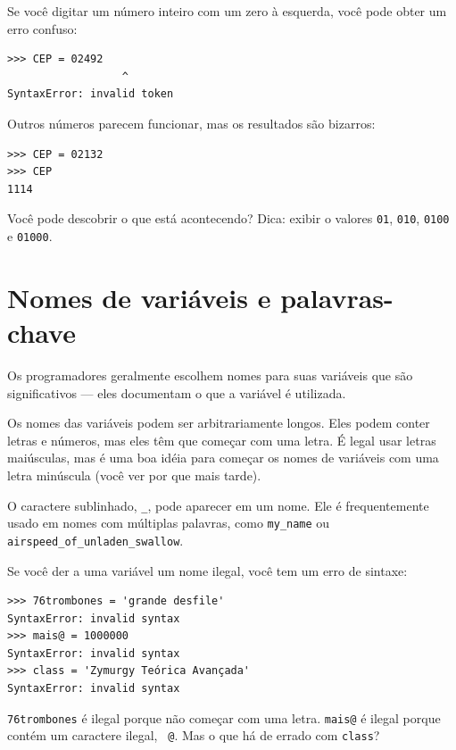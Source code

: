 \documentclass[10pt]{book}
\begin{document}
\begin{exercise}

Se você digitar um número inteiro com um zero à esquerda, você pode obter
um erro confuso:

\begin{verbatim}
>>> CEP = 02492
                  ^
SyntaxError: invalid token
\end{verbatim}

Outros números parecem funcionar, mas os resultados são bizarros:

\begin{verbatim}
>>> CEP = 02132
>>> CEP
1114
\end{verbatim}

Você pode descobrir o que está acontecendo? Dica: exibir o
valores {\tt 01}, {\tt 010}, {\tt 0100} e {\tt 01000}.

\end{exercise}



\section{Nomes de variáveis ​​e palavras-chave}

Os programadores geralmente escolhem nomes para suas variáveis ​​que
são significativos --- eles documentam o que a variável é utilizada.

Os nomes das variáveis ​​podem ser arbitrariamente longos. Eles podem conter
letras e números, mas eles têm que começar com uma letra.
É legal usar letras maiúsculas, mas é uma boa idéia
para começar os nomes de variáveis ​​com uma letra minúscula (você
ver por que mais tarde).

O caractere sublinhado, \verb"_", pode aparecer em um nome.
Ele é frequentemente usado em nomes com múltiplas palavras, como
\verb"my_name" ou \verb"airspeed_of_unladen_swallow".

Se você der a uma variável um nome ilegal, você tem um erro de sintaxe:

\begin{verbatim}
>>> 76trombones = 'grande desfile'
SyntaxError: invalid syntax
>>> mais@ = 1000000
SyntaxError: invalid syntax
>>> class = 'Zymurgy Teórica Avançada'
SyntaxError: invalid syntax
\end{verbatim}
%
{\tt76trombones} é ilegal porque não começar com uma letra.
{\tt mais@} é ilegal porque contém um caractere ilegal, {\tt
@}. Mas o que há de errado com {\tt class}?
\end{document}
